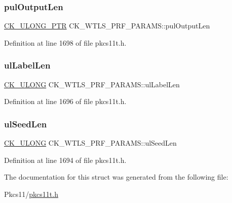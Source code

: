 \subsubsection{\texorpdfstring{pul\+Output\+Len}{pulOutputLen}}
{\footnotesize\ttfamily \hyperlink{pkcs11t_8h_af18ced3aa6adcd9f76ae8c132ed2eeb9}{C\+K\+\_\+\+U\+L\+O\+N\+G\+\_\+\+P\+TR} C\+K\+\_\+\+W\+T\+L\+S\+\_\+\+P\+R\+F\+\_\+\+P\+A\+R\+A\+M\+S\+::pul\+Output\+Len}



Definition at line 1698 of file pkcs11t.\+h.

\mbox{\label{struct_c_k___w_t_l_s___p_r_f___p_a_r_a_m_s_a28b6aa5bf2481a161c0da65b03172c65}} 
\subsubsection{\texorpdfstring{ul\+Label\+Len}{ulLabelLen}}
{\footnotesize\ttfamily \hyperlink{pkcs11t_8h_a35181858a3b7a0a81f49d180d8f446ef}{C\+K\+\_\+\+U\+L\+O\+NG} C\+K\+\_\+\+W\+T\+L\+S\+\_\+\+P\+R\+F\+\_\+\+P\+A\+R\+A\+M\+S\+::ul\+Label\+Len}



Definition at line 1696 of file pkcs11t.\+h.

\mbox{\label{struct_c_k___w_t_l_s___p_r_f___p_a_r_a_m_s_a7d8b97f28c8b840279020456f79dd417}} 
\subsubsection{\texorpdfstring{ul\+Seed\+Len}{ulSeedLen}}
{\footnotesize\ttfamily \hyperlink{pkcs11t_8h_a35181858a3b7a0a81f49d180d8f446ef}{C\+K\+\_\+\+U\+L\+O\+NG} C\+K\+\_\+\+W\+T\+L\+S\+\_\+\+P\+R\+F\+\_\+\+P\+A\+R\+A\+M\+S\+::ul\+Seed\+Len}



Definition at line 1694 of file pkcs11t.\+h.



The documentation for this struct was generated from the following file\+:\begin{DoxyCompactItemize}
\item 
Pkcs11/\hyperlink{pkcs11t_8h}{pkcs11t.\+h}\end{DoxyCompactItemize}
